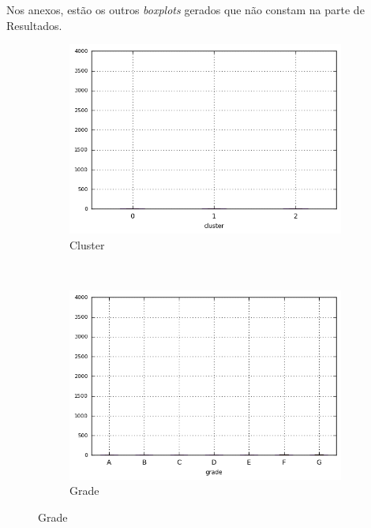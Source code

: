 \begin{anexosenv}
Nos anexos, estão os outros \emph{boxplots} gerados que não constam na parte de Resultados.


\begin{figure}[ht!]
    \centering
        \caption{\emph{Boxplots} de collection\textunderscore recovery\textunderscore fee }
        \begin{subfigure}[t]{0.45\textwidth}
            \centering
            \caption{Cluster }

            \centerline{\includegraphics[width=1\textwidth]{img/collection_recovery_fee_by_cluster}}
        \end{subfigure}%
        ~ 
        \begin{subfigure}[t]{0.45\textwidth}
            \centering
            \caption{Grade}
   
            \centerline{\includegraphics[width=1\textwidth]{img/collection_recovery_fee_by_grade}}


\end{subfigure}
\end{figure}
\end{anexosenv}
